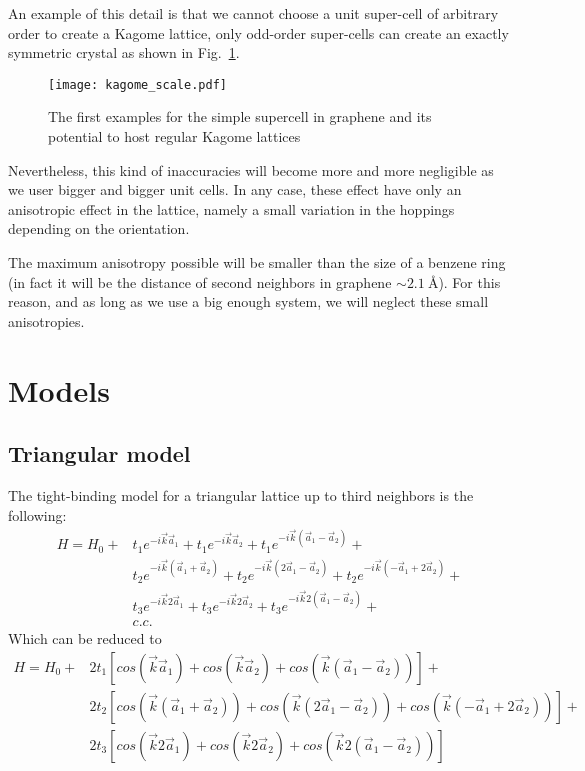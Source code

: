 \documentclass[a4paper]{article}
\begin{document}
An example of this detail is that we cannot choose a unit super-cell of arbitrary order to create a Kagome lattice, only odd-order super-cells can create an exactly symmetric crystal as shown in Fig.~\ref{kagome}.
\begin{figure}[h!]
  \centering
  \texttt{[image: kagome\_scale.pdf]}
  \vspace{-5pt}
  \caption{The first examples for the simple supercell in graphene and its potential to host regular Kagome lattices}
  \label{kagome}
\end{figure}
\FloatBarrier
Nevertheless, this kind of inaccuracies will become more and more negligible as we user bigger and bigger unit cells.
In any case, these effect have only an anisotropic effect in the lattice, namely a small variation in the hoppings depending on the orientation.

The maximum anisotropy possible will be smaller than the size of a benzene ring (in fact it will be the distance of second neighbors in graphene $\sim\SI{2.1}{\angstrom}$). For this reason, and as long as we use a big enough system, we will neglect these small anisotropies.


\section{Models} %
\label{models}
\subsection{Triangular model}
The tight-binding model for a triangular lattice up to third neighbors is the following:
\begin{equation}
  \begin{split}
  H = H_0 +
      &t_1e^{-i\vec{k}\vec{a}_1} + t_1e^{-i\vec{k}\vec{a}_2} + t_1e^{-i\vec{k}(\vec{a}_1-\vec{a}_2)}+\\
      &t_2e^{-i\vec{k}(\vec{a}_1+\vec{a}_2)} + t_2e^{-i\vec{k}(2\vec{a}_1-\vec{a}_2)} +
      t_2e^{-i\vec{k}(-\vec{a}_1+2\vec{a}_2)}+\\
      &t_3e^{-i\vec{k}2\vec{a}_1} + t_3e^{-i\vec{k}2\vec{a}_2} + t_3e^{-i\vec{k}2(\vec{a}_1-\vec{a}_2)}+\\
      &c.c.
    \end{split}
\end{equation}
Which can be reduced to
\begin{equation}
  \begin{split}
  H = H_0 +
      &2t_1\left[cos(\vec{k}\vec{a}_1) + cos(\vec{k}\vec{a}_2) + cos(\vec{k}(\vec{a}_1-\vec{a}_2))\right]+\\
      &2t_2\left[cos(\vec{k}(\vec{a}_1+\vec{a}_2)) + cos(\vec{k}(2\vec{a}_1-\vec{a}_2)) +
      cos(\vec{k}(-\vec{a}_1+2\vec{a}_2))\right]+\\
      &2t_3\left[cos(\vec{k}2\vec{a}_1) + cos(\vec{k}2\vec{a}_2) + cos(\vec{k}2(\vec{a}_1-\vec{a}_2))\right]
    \end{split}
\end{equation}
\end{document}
